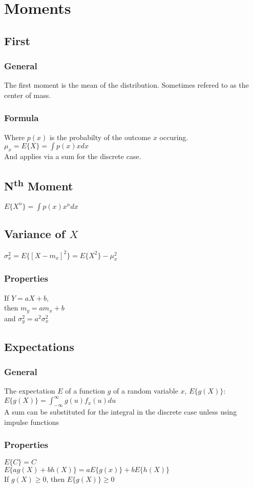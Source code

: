 \section*{Moments}
\subsection*{First}

\subsubsection*{General}
The first moment is the mean of the distribution. Sometimes refered to as the center of mass.

\subsubsection*{Formula}
Where $p(x)$ is the probabilty of the outcome $x$ occuring.
$\mu_x=E\{X\}=\int p(x)xdx$\\
And applies via a sum for the discrete case.

\subsection*{N\textsuperscript{th} Moment}
$E\{X^n\}=\int p(x)x^ndx$\\


\subsection*{Variance of $X$}    

$\sigma_x^2 = E\{[X-m_x]^2\}=E\{X^2\}-\mu_x^2$

\subsubsection*{Properties}
If $Y=aX+b$, \\ 
then $m_y=am_x+b$ \\
and 
$\sigma_y^2=a^2\sigma_x^2$

\subsection*{Expectations}
\subsubsection*{General}
The expectation $E$ of a function $g$ of a random variable $x$, $E\{g(X)\}$: \\
$E\{g(X)\}=\int_{-\infty}^{\infty}g(u)f_x(u)du$ \\
A sum can be substituted for the integral in the discrete case unless using impulse functions

\subsubsection*{Properties}
$E\{C\}=C$ \\
$E\{ag(X)+bh(X)\}=aE\{g(x)\}+bE\{h(X)\}$ \\
If $g(X)\geq 0$, then $E\{g(X)\} \geq 0$


    

